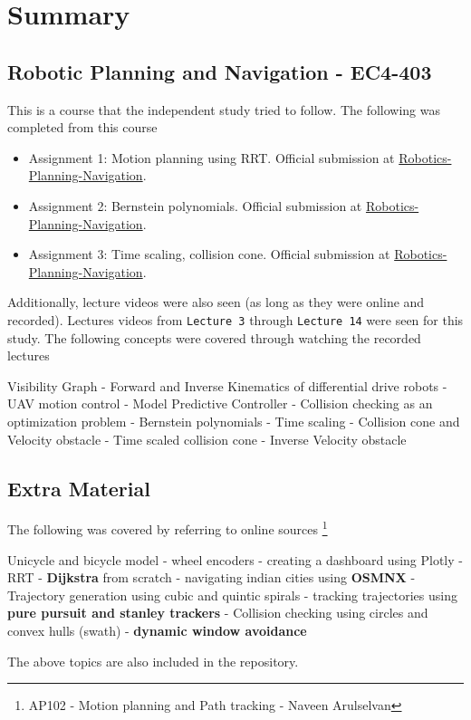 \section{Summary}

\subsection{Robotic Planning and Navigation - EC4-403}
This is a course that the independent study tried to follow. The following was completed from this course

\begin{itemize}
    \item Assignment 1: Motion planning using RRT. Official submission at \href{https://github.com/Robotics-Planning-Navigation/assignment1-over-9000/tree/dev-avneesh}{Robotics-Planning-Navigation}.
    \item Assignment 2: Bernstein polynomials. Official submission at \href{https://github.com/Robotics-Planning-Navigation/assignment-two-TheProjectsGuy}{Robotics-Planning-Navigation}.
    \item Assignment 3: Time scaling, collision cone. Official submission at \href{https://github.com/Robotics-Planning-Navigation/assignment-2b-over-9000/tree/dev-avneesh}{Robotics-Planning-Navigation}.
\end{itemize}

Additionally, lecture videos were also seen (as long as they were online and recorded). Lectures videos from \texttt{Lecture 3} through \texttt{Lecture 14} were seen for this study. The following concepts were covered through watching the recorded lectures

\begin{displayquote}
    Visibility Graph - Forward and Inverse Kinematics of differential drive robots - UAV motion control - Model Predictive Controller - Collision checking as an optimization problem - Bernstein polynomials - Time scaling - Collision cone and Velocity obstacle - Time scaled collision cone - Inverse Velocity obstacle
\end{displayquote}

\subsection{Extra Material}

The following was covered by referring to online sources \footnote{AP102 - Motion planning and Path tracking - Naveen Arulselvan}

\begin{displayquote}
    Unicycle and bicycle model - wheel encoders - creating a dashboard using Plotly - RRT - \textbf{ Dijkstra} from scratch - navigating indian cities using \textbf{OSMNX} - Trajectory generation using cubic and quintic spirals - tracking trajectories using \textbf{pure pursuit and stanley trackers} - Collision checking using circles and convex hulls (swath) - \textbf{dynamic window avoidance}
\end{displayquote}

The above topics are also included in the repository.

